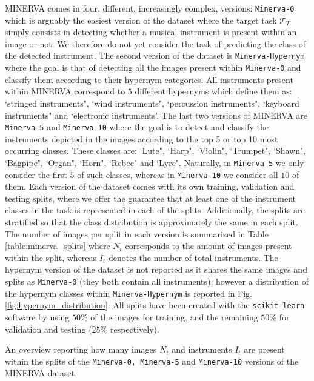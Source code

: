 MINERVA comes in four, different, increasingly complex, versions: \texttt{Minerva-0} which is arguably the easiest version of the dataset where the target task $\mathcal{T}_T$ simply consists in detecting whether a musical instrument is present within an image or not. We therefore do not yet consider the task of predicting the class of the detected instrument. The second version of the dataset is \texttt{Minerva-Hypernym} where the goal is that of detecting all the images present within \texttt{Minerva-0} and classify them according to their hypernym categories. All instruments present within MINERVA correspond to $5$ different hypernyms which define them as: `stringed instruments", `wind instruments", `percussion instruments", `keyboard instruments" and `electronic instruments'. The last two versions of MINERVA are \texttt{Minerva-5} and \texttt{Minerva-10} where the goal is to detect and classify the instruments depicted in the images according to the top 5 or top 10 most occurring classes. These classes are: `Lute", `Harp", `Violin", `Trumpet", `Shawn", `Bagpipe", `Organ", `Horn", `Rebec" and `Lyre". Naturally, in \texttt{Minerva-5} we only consider the first $5$ of such classes, whereas in \texttt{Minerva-10} we consider all $10$ of them. Each version of the dataset comes with its own training, validation and testing splits, where we offer the guarantee that at least one of the instrument classes in the task is represented in each of the splits. Additionally, the splits are stratified so that the class distribution is approximately the same in each split. The number of images per split in each version is summarized in Table \ref{table:minerva_splits} where $N_t$ corresponds to the amount of images present within the split, whereas $I_t$ denotes the number of total instruments. The hypernym version of the dataset is not reported as it shares the same images and splits as \texttt{Minerva-0} (they both contain all instruments), however a distribution of the hypernym classes within \texttt{Minerva-Hypernym} is reported in Fig. \ref{fig:hypernym_distribution}. All splits have been created with the \texttt{scikit-learn} software \cite{pedregosa2011scikit} by using $50\%$ of the images for training, and the remaining $50\%$ for validation and testing ($25\%$ respectively). 

\begin{table}

\caption{An overview reporting how many images $N_t$ and instruments $I_t$ are present within the splits of the \texttt{Minerva-0, Minerva-5} and \texttt{Minerva-10} versions of the MINERVA dataset.}
\label{table:minerva_splits}
\end{table}

